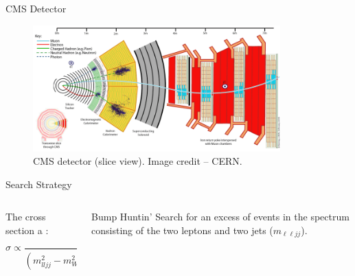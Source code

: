 \documentclass[aspectratio=169]{beamer}
\begin{document}
\begin{frame}{CMS Detector}
  \begin{figure}
    \centering
    \includegraphics[width=0.85\textwidth]{../figures/experiment/cms-slice.png}
    \caption{CMS detector (slice view). Image credit -- CERN.}
  \end{figure}
\end{frame}

\begin{frame}{Search Strategy}
  \begin{columns}
    \begin{column}{0.4\textwidth}
      \vfill
      {The cross section a :
      $$
        \sigma \propto \frac{1}{\left(m_{lljj}^{2} - m_{W_R}^{2}\right)^{2} + \Gamma^{2} m^{2}_{W_R}}
      $$}
      \begin{figure}
        \centering
        
      \end{figure}
    \end{column}
    \begin{column}{0.59\textwidth}
      \begin{block}{Bump Huntin'}
        Search for an excess of events in the  
        spectrum consisting of the two leptons and two jets ($m_{\ell \ell j j}$).
      \end{block}
      \begin{figure}
        \centering
        \resizebox{0.9\linewidth}{!}{%
      }
      \end{figure}
    \end{column}
  \end{columns}
\end{frame}
\end{document}
